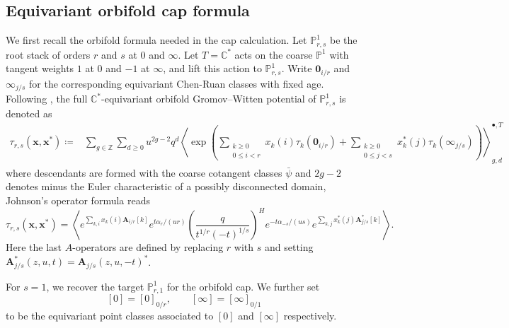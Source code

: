 \documentclass[letterpaper,12pt]{amsart}
\theoremstyle{definition}
\newcommand{\C}{\mathbb C}
\newcommand{\Z}{\mathbb Z}
\newcommand{\PP}{\mathbb P}
\numberwithin{equation}{section}
\begin{document}
\subsection{Equivariant orbifold cap formula}
We first recall the orbifold formula needed in the cap
calculation.  Let \(\PP^1_{r,s}\) be the root stack of orders \(r\) and
\(s\) at \(0\) and \(\infty\). Let \(T=\C^*\) acts on the coarse
\(\PP^1\) with tangent weights \(1\) at \(0\) and \(-1\) at \(\infty\),
and lift this action to \(\PP^1_{r,s}\).  Write
\(\mathbf 0_{i/r}\) and \(\boldsymbol\infty_{j/s}\) for the corresponding equivariant Chen-Ruan classes
with fixed age. Following \cite{J}, the full $\C^*$-equivariant orbifold Gromov--Witten potential of \(\PP^1_{r,s}\) is denoted as
\begin{align*}
 \tau_{r,s}(\mathbf x,\mathbf x^*)
 \coloneqq&\sum_{g\in\Z}\sum_{d\geq0}u^{2g-2}q^d
 \left\langle\exp\left(
 \sum_{\substack{k\geq0\\0\leq i<r}}
 x_k(i)\tau_k(\mathbf 0_{i/r})
 +\sum_{\substack{k\geq0\\0\leq j<s}}
 x_k^*(j)\tau_k(\boldsymbol\infty_{j/s})
 \right)\right\rangle^{\bullet,T}_{g,d}
\end{align*}
where descendants are formed with the coarse
cotangent classes \(\bar\psi\) and  \(2g-2\) denotes minus the Euler characteristic of a possibly
disconnected domain, Johnson's operator formula \cite[Theorem B]{J} reads
\begin{equation}\label{eq:Johnson-formula}
\tau_{r,s}(\mathbf x,\mathbf x^*)=
\left\langle
 e^{\sum_{k,i}x_k(i)\boldsymbol A_{i/r}[k]}
 e^{t\alpha_r/(ur)}
 \left(\frac{q}{t^{1/r}(-t)^{1/s}}\right)^H
 e^{-t\alpha_{-s}/(us)}
 e^{\sum_{k,j}x_k^*(j)\boldsymbol A_{j/s}^*[k]}
\right\rangle .
\end{equation}
Here the
last \(A\)-operators are defined by replacing \(r\) with \(s\) and setting
\(\boldsymbol A_{j/s}^*(z,u,t)=\boldsymbol A_{j/s}(z,u,-t)^*\).

For $s=1$, we recover the target \(\PP^1_{r,1}\) for the orbifold cap. We further set
\[[0]=[0]_{0/r},\qquad [\infty]=[\infty]_{0/1}\]
to be the equivariant point classes associated to $[0]$ and $[\infty]$ respectively.
\end{document}
